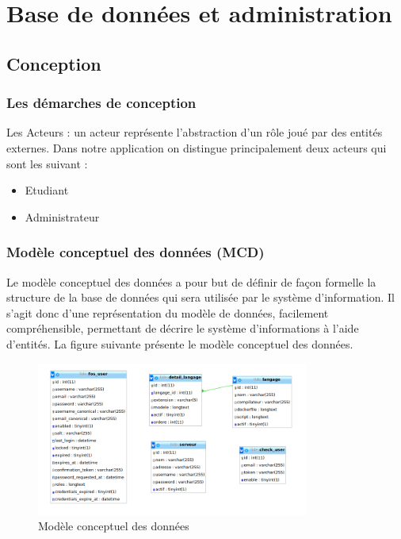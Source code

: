 \chapter{Base de données et administration}

\section{Conception}

\subsection{Les démarches de conception}

\par Les Acteurs : un acteur représente l’abstraction d’un rôle joué par des entités externes. Dans notre application on distingue principalement deux acteurs qui sont les suivant :

\begin{itemize}
\item Etudiant 
\item Administrateur
\end{itemize}

\subsection{Modèle conceptuel des données (MCD)}
 
\par Le modèle conceptuel des données a pour but de définir de façon formelle la structure de la base de données qui sera utilisée par le système d'information. Il s'agit donc d'une représentation du modèle de données, facilement compréhensible, permettant de décrire le système d'informations à l'aide d'entités. 
La figure suivante présente le modèle conceptuel des données.

\begin{figure}[H]
\centering
\includegraphics[width=0.8\textwidth]{./img/BDD.png}
\caption{Modèle conceptuel des données}
\end{figure}

